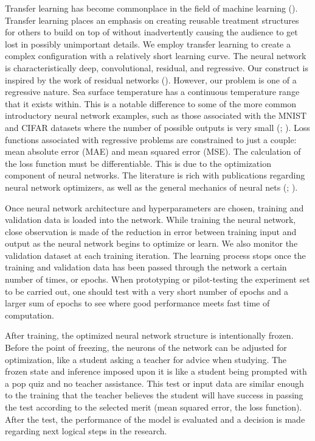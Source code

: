 \begin{refsection}
Transfer learning has become commonplace in the field of machine learning (\cite{weiss2016survey}). Transfer learning places an emphasis on creating reusable treatment structures for others to build on top of without inadvertently causing the audience to get lost in possibly unimportant details. We employ transfer learning to create a complex configuration with a relatively short learning curve. The neural network is characteristically deep, convolutional, residual, and regressive. Our construct is inspired by the work of residual networks (\cite{he2016deep}). However, our problem is one of a regressive nature. Sea surface temperature has a continuous temperature range that it exists within. This is a notable difference to some of the more common introductory neural network examples, such as those associated with the MNIST and CIFAR datasets where the number of possible outputs is very small (\cite{xiao2017fashion}; \cite{krizhevsky2010convolutional}). Loss functions associated with regressive problems are constrained to just a couple: mean absolute error (MAE) and mean squared error (MSE). The calculation of the loss function must be differentiable. This is due to the optimization component of neural networks. The literature is rich with publications regarding neural network optimizers, as well as the general mechanics of neural nets (\cite{andrychowicz2016learning}; \cite{kingma2014adam}).

Once neural network architecture and hyperparameters are chosen, training and validation data is loaded into the network. While training the neural network, close observation is made of the reduction in error between training input and output as the neural network begins to optimize or learn. We also monitor the validation dataset at each training iteration. The learning process stops once the training and validation data has been passed through the network a certain number of times, or epochs. When prototyping or pilot-testing the experiment set to be carried out, one should test with a very short number of epochs and a larger sum of epochs to see where good performance meets fast time of computation.  

After training, the optimized neural network structure is intentionally frozen. Before the point of freezing, the neurons of the network can be adjusted for optimization, like a student asking a teacher for advice when studying. The frozen state and inference imposed upon it is like a student being prompted with a pop quiz and no teacher assistance. This test or input data are similar enough to the training that the teacher believes the student will have success in passing the test according to the selected merit (mean squared error, the loss function). After the test, the performance of the model is evaluated and a decision is made regarding next logical steps in the research.


\end{refsection}
